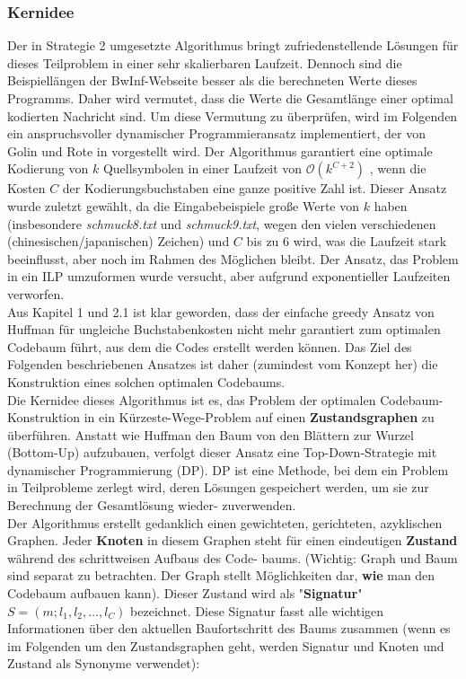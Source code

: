 \documentclass[a4paper,10pt,ngerman]{scrartcl}
\begin{document}
\subsubsection{Kernidee}
Der in Strategie 2 umgesetzte Algorithmus bringt zufriedenstellende Lösungen für dieses Teilproblem in einer sehr skalierbaren Laufzeit. Dennoch sind die Beispiellängen der BwInf-Webseite besser als die berechneten Werte dieses Programms. Daher wird vermutet, dass die Werte die Gesamtlänge einer optimal kodierten Nachricht sind. Um diese Vermutung zu überprüfen, wird im Folgenden ein anspruchsvoller dynamischer Programmieransatz implementiert, der von Golin und Rote in \cite{papergolinrote} vorgestellt wird. Der Algorithmus garantiert eine optimale Kodierung von $k$ Quellsymbolen in einer Laufzeit von $\mathcal{O}(k^{C+2})$ , wenn die Kosten $C$ der Kodierungsbuchstaben eine ganze positive Zahl ist. Dieser Ansatz wurde zuletzt gewählt, da die Eingabebeispiele große Werte von $k$ haben (insbesondere \textit{schmuck8.txt} und \textit{schmuck9.txt}, wegen den vielen verschiedenen (chinesischen/japanischen) Zeichen) und $C$ bis zu 6 wird, was die Laufzeit stark beeinflusst, aber noch im Rahmen des Möglichen bleibt. Der Ansatz, das Problem in ein ILP umzuformen wurde versucht, aber aufgrund exponentieller Laufzeiten verworfen. \\
\newline
Aus Kapitel 1 und 2.1 ist klar geworden, dass der einfache greedy Ansatz von Huffman für ungleiche Buchstabenkosten nicht mehr garantiert zum optimalen Codebaum führt, aus dem die Codes erstellt werden können. Das Ziel des Folgenden beschriebenen Ansatzes ist daher (zumindest vom Konzept her) die Konstruktion eines solchen optimalen Codebaums. 
\\\newline
Die Kernidee dieses Algorithmus ist es, das Problem der optimalen Codebaum-Konstruktion in ein Kürzeste-Wege-Problem auf einen \textbf{Zustandsgraphen} zu überführen. Anstatt wie Huffman den Baum von den Blättern zur Wurzel (Bottom-Up) aufzubauen, verfolgt dieser Ansatz eine Top-Down-Strategie mit dynamischer Programmierung (DP). DP ist eine Methode, bei dem ein Problem in Teilprobleme zerlegt wird, deren Lösungen gespeichert werden, um sie zur Berechnung der Gesamtlösung wieder- zuverwenden.
\\\newline
Der Algorithmus erstellt gedanklich einen gewichteten, gerichteten, azyklischen Graphen. Jeder \textbf{Knoten} in diesem Graphen steht für einen eindeutigen \textbf{Zustand} während des schrittweisen Aufbaus des Code- baums. (Wichtig: Graph und Baum sind separat zu betrachten. Der Graph stellt Möglichkeiten dar, \textbf{wie} man den Codebaum aufbauen kann). Dieser Zustand wird als "\textbf{Signatur}" $S = (m; l_1, l_2, ..., l_C)$ bezeichnet. Diese Signatur fasst alle wichtigen Informationen über den aktuellen Baufortschritt des Baums zusammen (wenn es im Folgenden um den Zustandsgraphen geht, werden Signatur und Knoten und Zustand als Synonyme verwendet):
\end{document}
